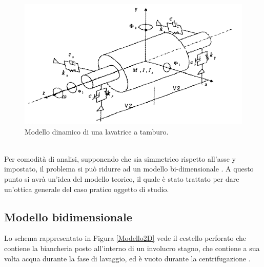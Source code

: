 \begin{figure}[h]
    \centering
    \includegraphics[scale=0.5]{ModelloRotore.png}
    \caption{Modello dinamico di una lavatrice a tamburo.}
    \label{ModelloRotore}
\end{figure}\\
Per comodità di analisi, supponendo che sia simmetrico rispetto all'asse y impostato, il problema si può ridurre ad un modello bi-dimensionale \cite{choi2003study}. 
A questo punto si avrà un'idea del modello teorico, il quale è stato trattato per dare un'ottica generale del caso pratico oggetto di studio.
\subsection{Modello bidimensionale}
Lo schema rappresentato in Figura \ref{Modello2D} vede il cestello perforato che contiene la biancheria posto all'interno di un involucro stagno, che contiene a sua volta acqua durante la fase di lavaggio, ed è vuoto durante la centrifugazione \cite{esercitazioneapplicata}.

